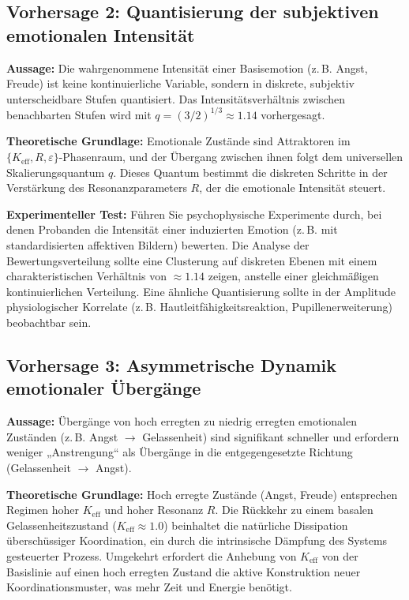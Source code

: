 \documentclass[12pt,a4paper]{article}
\begin{document}
	\subsection{Vorhersage 2: Quantisierung der subjektiven emotionalen Intensität}
	
	\textbf{Aussage:} Die wahrgenommene Intensität einer Basisemotion (z. B. Angst, Freude) ist keine kontinuierliche Variable, sondern in diskrete, subjektiv unterscheidbare Stufen quantisiert. Das Intensitätsverhältnis zwischen benachbarten Stufen wird mit \(q = (3/2)^{1/3} \approx 1.14\) vorhergesagt.
	
	\textbf{Theoretische Grundlage:} Emotionale Zustände sind Attraktoren im \(\{K_{\mathrm{eff}}, R, \varepsilon\}\)-Phasenraum, und der Übergang zwischen ihnen folgt dem universellen Skalierungsquantum \(q\). Dieses Quantum bestimmt die diskreten Schritte in der Verstärkung des Resonanzparameters \(R\), der die emotionale Intensität steuert.
	
	\textbf{Experimenteller Test:} Führen Sie psychophysische Experimente durch, bei denen Probanden die Intensität einer induzierten Emotion (z. B. mit standardisierten affektiven Bildern) bewerten. Die Analyse der Bewertungsverteilung sollte eine Clusterung auf diskreten Ebenen mit einem charakteristischen Verhältnis von \(\approx 1.14\) zeigen, anstelle einer gleichmäßigen kontinuierlichen Verteilung. Eine ähnliche Quantisierung sollte in der Amplitude physiologischer Korrelate (z. B. Hautleitfähigkeitsreaktion, Pupillenerweiterung) beobachtbar sein.
	
	\subsection{Vorhersage 3: Asymmetrische Dynamik emotionaler Übergänge}
	
	\textbf{Aussage:} Übergänge von hoch erregten zu niedrig erregten emotionalen Zuständen (z. B. Angst \(\rightarrow\) Gelassenheit) sind signifikant schneller und erfordern weniger „Anstrengung“ als Übergänge in die entgegengesetzte Richtung (Gelassenheit \(\rightarrow\) Angst).
	
	\textbf{Theoretische Grundlage:} Hoch erregte Zustände (Angst, Freude) entsprechen Regimen hoher \(K_{\mathrm{eff}}\) und hoher Resonanz \(R\). Die Rückkehr zu einem basalen Gelassenheitszustand (\(K_{\mathrm{eff}} \approx 1.0\)) beinhaltet die natürliche Dissipation überschüssiger Koordination, ein durch die intrinsische Dämpfung des Systems gesteuerter Prozess. Umgekehrt erfordert die Anhebung von \(K_{\mathrm{eff}}\) von der Basislinie auf einen hoch erregten Zustand die aktive Konstruktion neuer Koordinationsmuster, was mehr Zeit und Energie benötigt.
	
\end{document}
